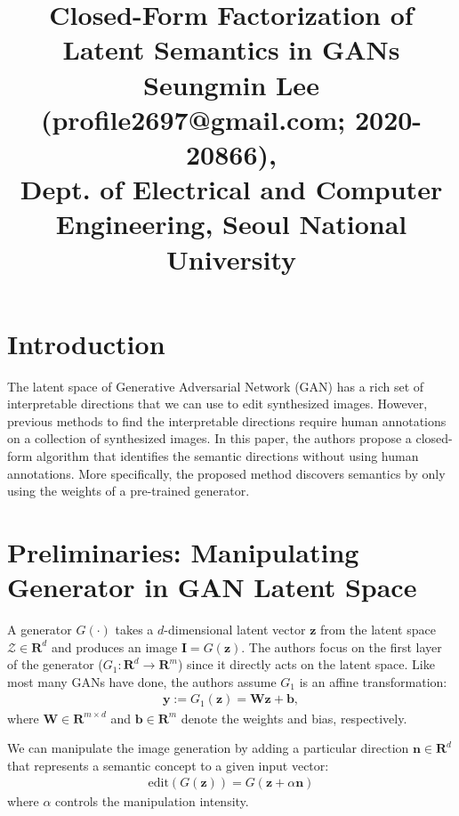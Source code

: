 \documentclass[10pt,twocolumn,letterpaper]{article}
\begin{document}
\title{Closed-Form Factorization of Latent Semantics in GANs\\ {\rm {\normalsize Seungmin Lee (profile2697@gmail.com; 2020-20866), \\Dept. of Electrical and Computer Engineering, Seoul National University}}}   %

\maketitle
\thispagestyle{empty}

\section{Introduction}
The latent space of Generative Adversarial Network (GAN) has a rich set of interpretable directions that we can use to edit synthesized images. However, previous methods to find the interpretable directions require human annotations on a collection of synthesized images. In this paper, the authors propose a closed-form algorithm that identifies the semantic directions without using human annotations. More specifically, the proposed method discovers semantics by only using the weights of a pre-trained generator.

\section{Preliminaries: Manipulating Generator in GAN Latent Space}
A generator $G(\cdot)$ takes a $d$-dimensional latent vector $\mathbf{z}$ from the latent space $\mathcal{Z} \in \mathbf{R}^d$ and produces an image $\mathbf{I} = G(\mathbf{z})$. The authors focus on the first layer of the generator ($G_1\colon \mathbf{R}^d \to \mathbf{R}^m$) since it directly acts on the latent space. Like most many GANs have done, the authors assume $G_1$ is an affine transformation:
\begin{align*}
    \mathbf{y} := G_1(\mathbf{z}) = \mathbf{W}\mathbf{z} + \mathbf{b},
\end{align*}
where $\mathbf{W} \in \mathbf{R}^{m \times d}$ and $\mathbf{b} \in \mathbf{R}^m$ denote the weights and bias, respectively.

We can manipulate the image generation by adding a particular direction $\mathbf{n} \in \mathbf{R}^d$ that represents a semantic concept to a given input vector: 
\begin{align*}
    \text{edit}(G(\mathbf{z})) = G(\mathbf{z} + \alpha\mathbf{n})
\end{align*}
where $\alpha$ controls the manipulation intensity.
\end{document}
